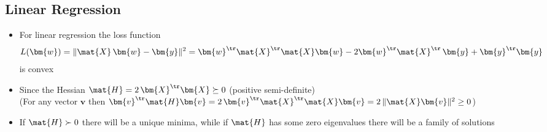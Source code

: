 
\begin{slide}
\section{Linear Regression}

\begin{PauseHighLight}
  \begin{itemize}
  \item For linear regression the loss function
    \begin{align*}
      L(\bm{w}) = \| \mat{X}\, \bm{w} - \bm{y} \|^2 = \bm{w}^\tr
      \mat{X}^\tr\mat{X} \bm{w} - 2 \bm{w}^\tr \mat{X}^\tr\, \bm{y} +
      \bm{y}^\tr \bm{y}
    \end{align*}
    is convex\pause
  \item Since the Hessian $\mat{H} = 2\,\bm{X}^\tr \bm{X} \succeq 0$
    (positive semi-definite)\pause\\
    (For any vector $\bm{v}$ then $\bm{v}^\tr \mat{H} \bm{v} =
    2\,\bm{v}^\tr\mat{X}^\tr \mat{X}\bm{v} = 2\,\| \mat{X}\bm{v} \|^2 \geq 0$)\pauseb
  \item If $\mat{H}\succ 0$ there will be a unique minima\pause, while
    if $\mat{H}$ has some zero eigenvalues there will be a family of
    solutions\pauseb
  \end{itemize}
\end{PauseHighLight}

\end{slide}


